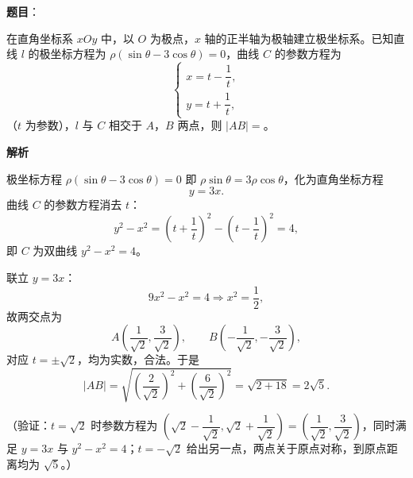 \begin{answer}

\textbf{题目}：

在直角坐标系 \(xOy\) 中，以 \(O\) 为极点，\(x\) 轴的正半轴为极轴建立极坐标系。已知直线 \(l\) 的极坐标方程为 \(\rho(\sin\theta-3\cos\theta)=0\)，曲线 \(C\) 的参数方程为
\nopagebreak[4]
\[
\begin{cases}
x=t-\dfrac{1}{t},\\[6pt]
y=t+\dfrac{1}{t},
\end{cases}
\]
（\(t\) 为参数），\(l\) 与 \(C\) 相交于 \(A\)，\(B\) 两点，则 \(|AB|=\)\gkblank{}。

\textbf{解析}

极坐标方程 \(\rho(\sin\theta-3\cos\theta)=0\) 即 \(\rho\sin\theta=3\rho\cos\theta\)，化为直角坐标方程
\nopagebreak[4]
\[
y=3x.
\]
曲线 \(C\) 的参数方程消去 \(t\)：
\nopagebreak[4]
\[
y^2-x^2=\left(t+\dfrac1t\right)^2-\left(t-\dfrac1t\right)^2=4,
\]
即 \(C\) 为双曲线 \(y^2-x^2=4\)。

联立 \(y=3x\)：
\nopagebreak[4]
\[
9x^2-x^2=4\Longrightarrow x^2=\dfrac12,
\]
故两交点为
\nopagebreak[4]
\[
A\left(\dfrac{1}{\sqrt2},\dfrac{3}{\sqrt2}\right),\qquad
B\left(-\dfrac{1}{\sqrt2},-\dfrac{3}{\sqrt2}\right),
\]
对应 \(t=\pm\sqrt2\)，均为实数，合法。于是
\nopagebreak[4]
\[
|AB|=\sqrt{\left(\dfrac{2}{\sqrt2}\right)^2+\left(\dfrac{6}{\sqrt2}\right)^2}
=\sqrt{2+18}=2\sqrt5.
\]

（验证：\(t=\sqrt2\) 时参数方程为 \(\left(\sqrt2-\dfrac{1}{\sqrt2},\sqrt2+\dfrac{1}{\sqrt2}\right)=\left(\dfrac{1}{\sqrt2},\dfrac{3}{\sqrt2}\right)\)，同时满足 \(y=3x\) 与 \(y^2-x^2=4\)；\(t=-\sqrt2\) 给出另一点，两点关于原点对称，到原点距离均为 \(\sqrt5\)。）


\end{answer}
